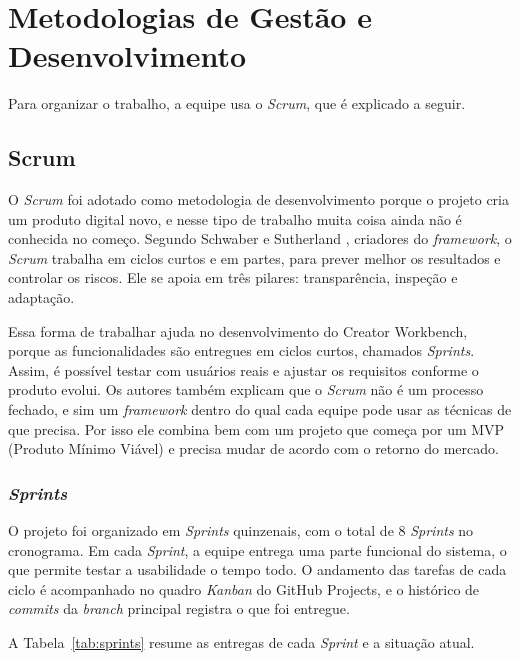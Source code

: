 \section{Metodologias de Gestão e Desenvolvimento}

Para organizar o trabalho, a equipe usa o \textit{Scrum}, que é explicado a seguir.

\subsection{Scrum}

O \textit{Scrum} foi adotado como metodologia de desenvolvimento porque o projeto cria um produto digital novo, e nesse tipo de trabalho muita coisa ainda não é conhecida no começo. Segundo Schwaber e Sutherland \cite{schwaber2020}, criadores do \textit{framework}, o \textit{Scrum} trabalha em ciclos curtos e em partes, para prever melhor os resultados e controlar os riscos. Ele se apoia em três pilares: transparência, inspeção e adaptação.

Essa forma de trabalhar ajuda no desenvolvimento do Creator Workbench, porque as funcionalidades são entregues em ciclos curtos, chamados \textit{Sprints}. Assim, é possível testar com usuários reais e ajustar os requisitos conforme o produto evolui. Os autores também explicam que o \textit{Scrum} não é um processo fechado, e sim um \textit{framework} dentro do qual cada equipe pode usar as técnicas de que precisa. Por isso ele combina bem com um projeto que começa por um MVP (Produto Mínimo Viável) e precisa mudar de acordo com o retorno do mercado.

\subsubsection{\textit{Sprints}}

O projeto foi organizado em \textit{Sprints} quinzenais, com o total de 8 \textit{Sprints} no cronograma. Em cada \textit{Sprint}, a equipe entrega uma parte funcional do sistema, o que permite testar a usabilidade o tempo todo. O andamento das tarefas de cada ciclo é acompanhado no quadro \textit{Kanban} do GitHub Projects, e o histórico de \textit{commits} da \textit{branch} principal registra o que foi entregue.

A Tabela~\ref{tab:sprints} resume as entregas de cada \textit{Sprint} e a situação atual.

